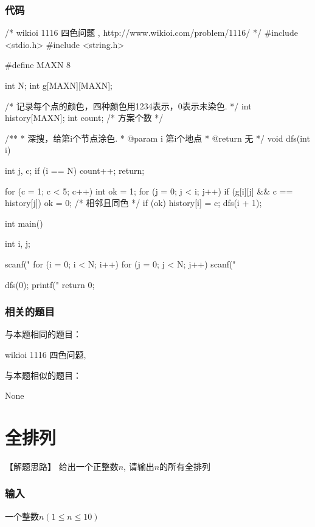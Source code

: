 \subsubsection{代码}
\begin{Codex}[label=four_colors.c]
/* wikioi 1116 四色问题   , http://www.wikioi.com/problem/1116/ */
#include <stdio.h>
#include <string.h>

#define MAXN 8

int N;
int g[MAXN][MAXN];

/* 记录每个点的颜色，四种颜色用1234表示，0表示未染色. */
int history[MAXN];
int count; /* 方案个数 */

/**
 * 深搜，给第i个节点涂色.
 * @param i 第i个地点
 * @return 无
 */
void dfs(int i) {
    int j, c;
    if (i == N) {
        count++;
        return;
    }

    for (c = 1; c < 5; c++) {
        int ok = 1;
        for (j = 0; j < i; j++) {
            if (g[i][j] && c == history[j])
                ok = 0; /* 相邻且同色 */
        }
        if (ok) {
            history[i] = c;
            dfs(i + 1);
        }
    }
}

int main() {
    int i, j;

    scanf("%
    for (i = 0; i < N; i++) {
        for (j = 0; j < N; j++) {
            scanf("%
        }
    }

    dfs(0);
    printf("%
    return 0;
}
\end{Codex}

\subsubsection{相关的题目}
与本题相同的题目：
\begindot
\item wikioi 1116 四色问题, 
\myenddot

与本题相似的题目：
\begindot
\item None
\myenddot


\section{全排列} %

【解题思路】
给出一个正整数$n$, 请输出$n$的所有全排列

\subsubsection{输入}
一个整数$n(1 \leq n \leq 10)$

